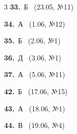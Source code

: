\documentclass[12pt]{article}
\begin{document}
\ifshowsolutions
{}
\begin{multicols}{3}\noindent
\noindent\textbf{33.}~Б \ {\scriptsize\color{gray}(23.05, №11)}\par
\noindent\textbf{34.}~А \ {\scriptsize\color{gray}(1.06, №12)}\par
\noindent\textbf{35.}~Б \ {\scriptsize\color{gray}(2.06, №1)}\par
\noindent\textbf{36.}~Д \ {\scriptsize\color{gray}(3.06, №1)}\par
\noindent\textbf{37.}~А \ {\scriptsize\color{gray}(5.06, №11)}\par
\noindent\textbf{42.}~Б \ {\scriptsize\color{gray}(17.06, №15)}\par
\noindent\textbf{43.}~А \ {\scriptsize\color{gray}(18.06, №1)}\par
\noindent\textbf{44.}~В \ {\scriptsize\color{gray}(19.06, №4)}\par
\end{multicols}
\fi

\endgroup
\end{document}
